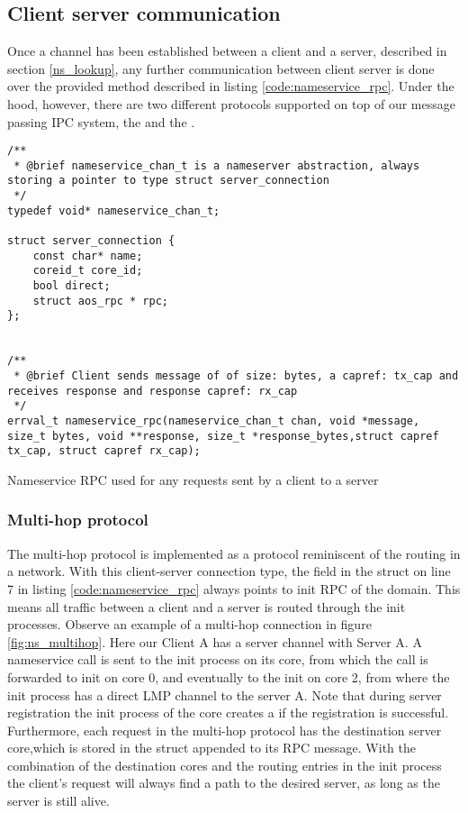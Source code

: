 \subsection{Client server communication}

Once a channel has been established between a client and a server, described in section \ref{ns_lookup}, any further communication between client server is done over the provided method described in listing \ref{code:nameservice_rpc}. Under the hood, however, there are two different protocols supported on top of our message passing IPC system, the  and the .
\begin{code}
\begin{mdframed}[style=myframe]
\begin{verbatim}
/**
 * @brief nameservice_chan_t is a nameserver abstraction, always storing a pointer to type struct server_connection
 */
typedef void* nameservice_chan_t;

struct server_connection {
	const char* name;
	coreid_t core_id;
	bool direct;
	struct aos_rpc * rpc;
};


/**
 * @brief Client sends message of of size: bytes, a capref: tx_cap and receives response and response capref: rx_cap
 */
errval_t nameservice_rpc(nameservice_chan_t chan, void *message, size_t bytes, void **response, size_t *response_bytes,struct capref tx_cap, struct capref rx_cap);
\end{verbatim}
\end{mdframed}
\caption{Nameservice RPC used for any requests sent by a client to a server}
\newline
\label{code:nameservice_rpc}
\end{code}

\subsubsection{Multi-hop protocol} \label{mulit_hop}

The multi-hop protocol is implemented as a protocol reminiscent of the routing in a network. With this client-server connection type, the field  in the struct  on line 7 in listing \ref{code:nameservice_rpc} always points to init RPC of the domain. This means all traffic between a client and a server is routed through the init processes. Observe an example of a multi-hop connection in figure \ref{fig:ns_multihop}. Here our Client A has a server channel with Server A. A nameservice call is sent to the init process on its core, from which the call is forwarded to init on core 0, and eventually to the init on core 2, from where the init process has a direct LMP channel to the server A. Note that during server registration the init process of the core creates a  if the registration is successful. Furthermore, each request in the multi-hop protocol has the destination server core,which is stored in the struct  appended to its RPC message. With the combination of the destination cores and the routing entries in the init process the client's request will always find a path to the desired server, as long as the server is still alive.


